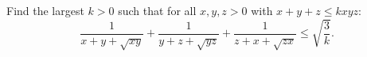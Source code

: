 Find the largest $k>0$ such that for all $x,y,z>0$ with $x+y+z\le kxyz$:
$$\frac{1}{x+y+\sqrt{xy}}+\frac{1}{y+z+\sqrt{yz}}+\frac{1}{z+x+\sqrt{zx}}\le\sqrt{\frac{3}{k}}.$$